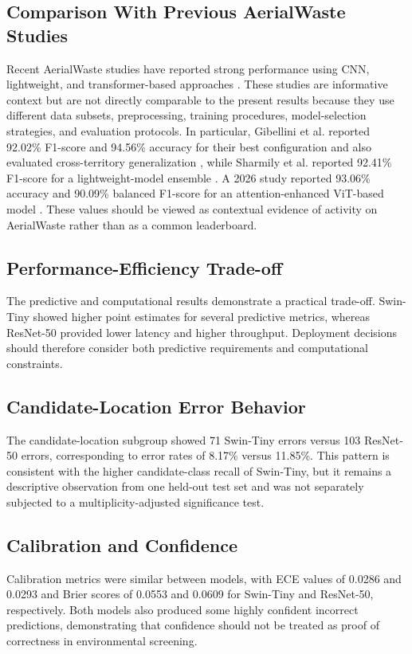 \documentclass[journal]{IEEEtran}
\begin{document}
\subsection{Comparison With Previous AerialWaste Studies}
Recent AerialWaste studies have reported strong performance using CNN, lightweight, and transformer-based approaches \cite{gibellini2025pipeline,sharmily2025landfill,anvith2026secbam}. These studies are informative context but are not directly comparable to the present results because they use different data subsets, preprocessing, training procedures, model-selection strategies, and evaluation protocols. In particular, Gibellini et al. reported 92.02\% F1-score and 94.56\% accuracy for their best configuration and also evaluated cross-territory generalization \cite{gibellini2025pipeline}, while Sharmily et al. reported 92.41\% F1-score for a lightweight-model ensemble \cite{sharmily2025landfill}. A 2026 study reported 93.06\% accuracy and 90.09\% balanced F1-score for an attention-enhanced ViT-based model \cite{anvith2026secbam}. These values should be viewed as contextual evidence of activity on AerialWaste rather than as a common leaderboard.

\subsection{Performance-Efficiency Trade-off}
The predictive and computational results demonstrate a practical trade-off. Swin-Tiny showed higher point estimates for several predictive metrics, whereas ResNet-50 provided lower latency and higher throughput. Deployment decisions should therefore consider both predictive requirements and computational constraints.

\subsection{Candidate-Location Error Behavior}
The candidate-location subgroup showed 71 Swin-Tiny errors versus 103 ResNet-50 errors, corresponding to error rates of 8.17\% versus 11.85\%. This pattern is consistent with the higher candidate-class recall of Swin-Tiny, but it remains a descriptive observation from one held-out test set and was not separately subjected to a multiplicity-adjusted significance test.

\subsection{Calibration and Confidence}
Calibration metrics were similar between models, with ECE values of 0.0286 and 0.0293 and Brier scores of 0.0553 and 0.0609 for Swin-Tiny and ResNet-50, respectively. Both models also produced some highly confident incorrect predictions, demonstrating that confidence should not be treated as proof of correctness in environmental screening.
\end{document}
